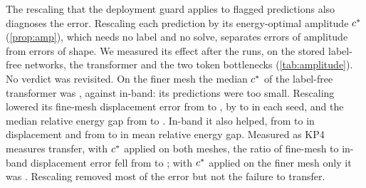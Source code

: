 

The rescaling that the deployment guard applies to flagged predictions also diagnoses the error.
Rescaling each prediction by its energy-optimal amplitude $c^{\ast}$ (\cref{prop:amp}), which
needs no label and no solve, separates errors of amplitude from errors of shape. We measured
its effect after the runs, on the stored label-free networks, the transformer and the two token bottlenecks (\cref{tab:amplitude}). No verdict was revisited. On the finer mesh the median
$c^{\ast}$ of the label-free transformer was \numAmpFineCstar{}, against \numAmpInCstar{}
in-band: its predictions were too small. Rescaling lowered its fine-mesh displacement error
from \numAmpFineDisp{} to \numAmpFineDispC{}, by \numAmpFineRedMin{} to \numAmpFineRedMax{}
in each seed, and the median relative energy gap from \numAmpFineGapMedian{} to
\numAmpFineGapMedianC{}. In-band it also helped, from \numAmpInDisp{} to \numAmpInDispC{} in
displacement and from \numAmpInGap{} to \numAmpInGapC{} in mean relative energy gap.
Measured as KP4 measures transfer, with $c^{\ast}$ applied on both meshes, the ratio of
fine-mesh to in-band displacement error fell from \numFineRatio{} to \numAmpRatioBoth{};
with $c^{\ast}$ applied on the finer mesh only it was \numAmpRatioFineOnly{}. Rescaling
removed most of the error but not the failure to transfer.





